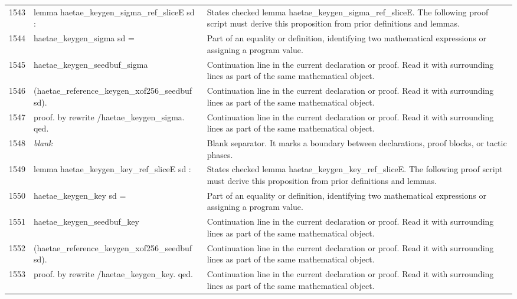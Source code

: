 \documentclass[10pt]{article}
\begin{document}
\begin{longtable}{r L{0.53\textwidth} L{0.37\textwidth}}
1543 & {\ttfamily\scriptsize lemma haetae\_keygen\_sigma\_ref\_sliceE sd :} & States checked lemma haetae\_keygen\_sigma\_ref\_sliceE.  The following proof script must derive this proposition from prior definitions and lemmas. \\
1544 & {\ttfamily\scriptsize   haetae\_keygen\_sigma sd =} & Part of an equality or definition, identifying two mathematical expressions or assigning a program value. \\
1545 & {\ttfamily\scriptsize   haetae\_keygen\_seedbuf\_sigma} & Continuation line in the current declaration or proof.  Read it with surrounding lines as part of the same mathematical object. \\
1546 & {\ttfamily\scriptsize     (haetae\_reference\_keygen\_xof256\_seedbuf sd).} & Continuation line in the current declaration or proof.  Read it with surrounding lines as part of the same mathematical object. \\
1547 & {\ttfamily\scriptsize proof. by rewrite /haetae\_keygen\_sigma. qed.} & Continuation line in the current declaration or proof.  Read it with surrounding lines as part of the same mathematical object. \\
1548 & {\ttfamily\scriptsize \emph{blank}} & Blank separator.  It marks a boundary between declarations, proof blocks, or tactic phases. \\
1549 & {\ttfamily\scriptsize lemma haetae\_keygen\_key\_ref\_sliceE sd :} & States checked lemma haetae\_keygen\_key\_ref\_sliceE.  The following proof script must derive this proposition from prior definitions and lemmas. \\
1550 & {\ttfamily\scriptsize   haetae\_keygen\_key sd =} & Part of an equality or definition, identifying two mathematical expressions or assigning a program value. \\
1551 & {\ttfamily\scriptsize   haetae\_keygen\_seedbuf\_key} & Continuation line in the current declaration or proof.  Read it with surrounding lines as part of the same mathematical object. \\
1552 & {\ttfamily\scriptsize     (haetae\_reference\_keygen\_xof256\_seedbuf sd).} & Continuation line in the current declaration or proof.  Read it with surrounding lines as part of the same mathematical object. \\
1553 & {\ttfamily\scriptsize proof. by rewrite /haetae\_keygen\_key. qed.} & Continuation line in the current declaration or proof.  Read it with surrounding lines as part of the same mathematical object. \\

\end{longtable}
\end{document}
